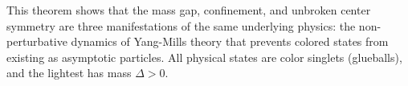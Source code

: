 \begin{remark}
This theorem shows that the mass gap, confinement, and unbroken center symmetry 
are three manifestations of the same underlying physics: the non-perturbative 
dynamics of Yang-Mills theory that prevents colored states from existing as 
asymptotic particles. All physical states are color singlets (glueballs), 
and the lightest has mass $\Delta > 0$.
\end{remark}






